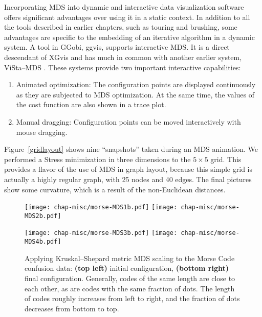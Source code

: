  Incorporating MDS into dynamic and interactive data
visualization software offers significant advantages over using it in
a static context.  In addition to all the tools described in earlier
chapters, such as touring and brushing, some advantages are specific
to the embedding of an iterative algorithm in a dynamic system. A tool
in GGobi, ggvis, supports interactive MDS.  It is a direct descendant
of XGvis \cite{LSDB92,xgvisjclass} and has much in common with
another earlier system, ViSta--MDS \cite{MY94}. These systems provide
two important interactive capabilities:


\begin{enumerate}
\item Animated optimization: The configuration points are displayed
continuously as they are subjected to MDS optimization.  At the same
time, the values of the cost function are also shown in a trace plot.
\item Manual dragging: Configuration points can be moved
interactively with mouse dragging.
\end{enumerate}

Figure~\ref{gridlayout} shows nine ``snapshots'' taken during an MDS
animation.  We performed a Stress minimization in three dimensions to
the $5\times 5$ grid.  This provides a flavor of the use of MDS in
graph layout, because this simple grid is actually a highly regular
graph, with 25 nodes and 40 edges.  The final pictures show some
curvature, which is a result of the non-Euclidean distances.

\begin{figure}[htbp]
\centerline{
  \texttt{[image: chap-misc/morse-MDS1b.pdf]}
  \texttt{[image: chap-misc/morse-MDS2b.pdf]}
}
\smallskip
\centerline{
  \texttt{[image: chap-misc/morse-MDS3b.pdf]}
  \texttt{[image: chap-misc/morse-MDS4b.pdf]}
}
\caption[Applying MDS to the  confusion data]
{Applying Kruskal--Shepard metric MDS scaling to the Morse Code
confusion data: {\bf (top left)} initial configuration, {\bf (bottom
right)} final configuration.  Generally, codes of the same length are
close to each other, as are codes with the same fraction of dots.  The
length of codes roughly increases from left to right, and the fraction
of dots decreases from bottom to top.  }
\label{morsecodes}
\end{figure}

